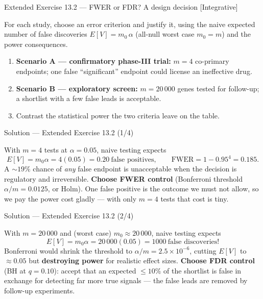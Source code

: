 \documentclass[aspectratio=169,11pt]{beamer}
\begin{document}
\begin{frame}{Extended Exercise 13.2 --- FWER or FDR? A design decision [Integrative]}
\begin{longexercise}
  For each study, choose an error criterion and justify it, using the naive expected
  number of false discoveries $E[V]=m_0\,\alpha$ (all-null worst case $m_0=m$) and the
  power consequences.
  \begin{enumerate}
    \item \textbf{Scenario A --- confirmatory phase-III trial:} $m=4$ co-primary
          endpoints; one false ``significant'' endpoint could license an ineffective drug.
    \item \textbf{Scenario B --- exploratory screen:} $m=20\,000$ genes tested for
          follow-up; a shortlist with a few false leads is acceptable.
    \item Contrast the statistical power the two criteria leave on the table.
  \end{enumerate}
\end{longexercise}
\end{frame}

\begin{frame}{Solution --- Extended Exercise 13.2 (1/4)}
\begin{solutionbox}
  With $m=4$ tests at $\alpha=0.05$, naive testing expects
  \[
    E[V]=m_0\alpha=4(0.05)=0.20\ \text{false positives},\qquad
    \mathrm{FWER}=1-0.95^4=0.185 .
  \]
  A $\sim$$19\%$ chance of \emph{any} false endpoint is unacceptable when the decision is
  regulatory and irreversible. \textbf{Choose FWER control} (Bonferroni threshold
  $\alpha/m=0.0125$, or Holm). One false positive is the outcome we must not allow, so we
  pay the power cost gladly --- with only $m=4$ tests that cost is tiny.
\end{solutionbox}
\end{frame}

\begin{frame}{Solution --- Extended Exercise 13.2 (2/4)}
\begin{solutionbox}
  With $m=20\,000$ and (worst case) $m_0\approx20\,000$, naive testing expects
  \[
    E[V]=m_0\alpha=20\,000(0.05)=1000\ \text{false discoveries!}
  \]
  Bonferroni would shrink the threshold to $\alpha/m=2.5\times10^{-6}$, cutting $E[V]$ to
  $\approx0.05$ but \textbf{destroying power} for realistic effect sizes. \textbf{Choose
  FDR control} (BH at $q=0.10$): accept that an expected $\le 10\%$ of the shortlist is
  false in exchange for detecting far more true signals --- the false leads are removed by
  follow-up experiments.
\end{solutionbox}
\end{frame}
\end{document}

